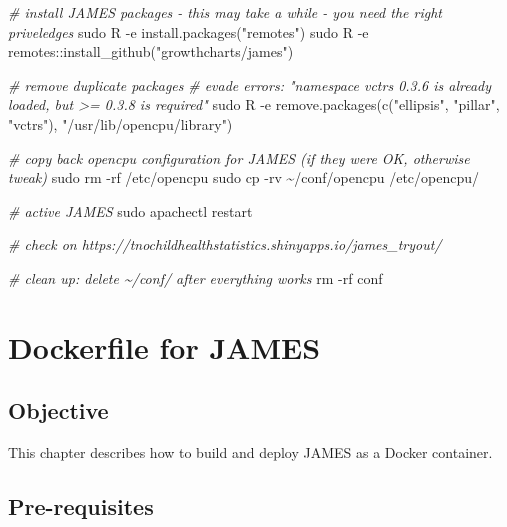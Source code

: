 \documentclass[
]{book}
\newenvironment{Shaded}{\begin{snugshade}}{\end{snugshade}}
\newcommand{\AttributeTok}[1]{\textcolor[rgb]{0.77,0.63,0.00}{#1}}
\newcommand{\CommentTok}[1]{\textcolor[rgb]{0.56,0.35,0.01}{\textit{#1}}}
\newcommand{\FunctionTok}[1]{\textcolor[rgb]{0.00,0.00,0.00}{#1}}
\newcommand{\NormalTok}[1]{#1}
\newcommand{\StringTok}[1]{\textcolor[rgb]{0.31,0.60,0.02}{#1}}
\begin{document}
\begin{Shaded}
\begin{Highlighting}[]
\CommentTok{\# install JAMES packages {-} this may take a while {-} you need the right priveledges}
\FunctionTok{sudo}\NormalTok{ R }\AttributeTok{{-}e} \StringTok{\textquotesingle{}install.packages("remotes")\textquotesingle{}}
\FunctionTok{sudo}\NormalTok{ R }\AttributeTok{{-}e} \StringTok{\textquotesingle{}remotes::install\_github("growthcharts/james")\textquotesingle{}}

\CommentTok{\# remove duplicate packages}
\CommentTok{\# evade errors: "namespace \textquotesingle{}vctrs\textquotesingle{} 0.3.6 is already loaded, but \textgreater{}= 0.3.8 is required"}
\FunctionTok{sudo}\NormalTok{ R }\AttributeTok{{-}e} \StringTok{\textquotesingle{}remove.packages(c("ellipsis", "pillar", "vctrs"), "/usr/lib/opencpu/library")\textquotesingle{}}

\CommentTok{\# copy back opencpu configuration for JAMES (if they were OK, otherwise tweak)}
\FunctionTok{sudo}\NormalTok{ rm }\AttributeTok{{-}rf}\NormalTok{ /etc/opencpu}
\FunctionTok{sudo}\NormalTok{ cp }\AttributeTok{{-}rv}\NormalTok{ \textasciitilde{}/conf/opencpu /etc/opencpu/}

\CommentTok{\# active JAMES}
\FunctionTok{sudo}\NormalTok{ apachectl restart}

\CommentTok{\# check on https://tnochildhealthstatistics.shinyapps.io/james\_tryout/ }

\CommentTok{\# clean up: delete \textasciitilde{}/conf/ after everything works}
\FunctionTok{rm} \AttributeTok{{-}rf}\NormalTok{ conf}
\end{Highlighting}
\end{Shaded}

\hypertarget{dockerfile-for-james}{%
\chapter{Dockerfile for JAMES}\label{dockerfile-for-james}}

\hypertarget{objective-2}{%
\section{Objective}\label{objective-2}}

This chapter describes how to build and deploy JAMES as a Docker container.

\hypertarget{pre-requisites-1}{%
\section{Pre-requisites}\label{pre-requisites-1}}
\end{document}
